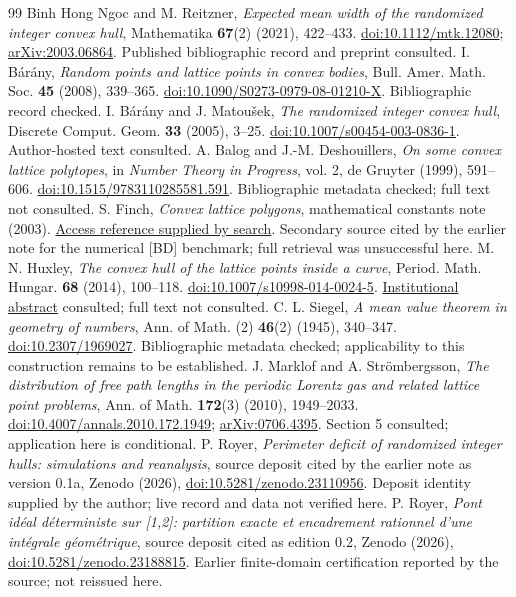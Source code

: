 \documentclass[11pt,a4paper]{article}
\begin{document}
\begin{thebibliography}{99}
\small
{} Binh Hong Ngoc and M. Reitzner, \emph{Expected mean width of the randomized integer convex hull}, Mathematika \textbf{67}(2) (2021), 422--433. \href{https://doi.org/10.1112/mtk.12080}{doi:10.1112/mtk.12080}; \href{https://arxiv.org/abs/2003.06864}{arXiv:2003.06864}. Published bibliographic record and preprint consulted.
 I. B\'ar\'any, \emph{Random points and lattice points in convex bodies}, Bull. Amer. Math. Soc. \textbf{45} (2008), 339--365. \href{https://doi.org/10.1090/S0273-0979-08-01210-X}{doi:10.1090/S0273-0979-08-01210-X}. Bibliographic record checked.
 I. B\'ar\'any and J. Matou\v{s}ek, \emph{The randomized integer convex hull}, Discrete Comput. Geom. \textbf{33} (2005), 3--25. \href{https://doi.org/10.1007/s00454-003-0836-1}{doi:10.1007/s00454-003-0836-1}. Author-hosted text consulted.
 A. Balog and J.-M. Deshouillers, \emph{On some convex lattice polytopes}, in \emph{Number Theory in Progress}, vol. 2, de Gruyter (1999), 591--606. \href{https://doi.org/10.1515/9783110285581.591}{doi:10.1515/9783110285581.591}. Bibliographic metadata checked; full text not consulted.
 S. Finch, \emph{Convex lattice polygons}, mathematical constants note (2003). \href{https://citeseerx.ist.psu.edu/document?doi=f490888bcfe4bcefa7ca0191182ae43f0cfca1e3&repid=rep1&type=pdf}{Access reference supplied by search}. Secondary source cited by the earlier note for the numerical [BD] benchmark; full retrieval was unsuccessful here.
 M. N. Huxley, \emph{The convex hull of the lattice points inside a curve}, Period. Math. Hungar. \textbf{68} (2014), 100--118. \href{https://doi.org/10.1007/s10998-014-0024-5}{doi:10.1007/s10998-014-0024-5}. \href{https://orca.cardiff.ac.uk/id/eprint/58596/}{Institutional abstract} consulted; full text not consulted.
 C. L. Siegel, \emph{A mean value theorem in geometry of numbers}, Ann. of Math. (2) \textbf{46}(2) (1945), 340--347. \href{https://doi.org/10.2307/1969027}{doi:10.2307/1969027}. Bibliographic metadata checked; applicability to this construction remains to be established.
 J. Marklof and A. Str\"ombergsson, \emph{The distribution of free path lengths in the periodic Lorentz gas and related lattice point problems}, Ann. of Math. \textbf{172}(3) (2010), 1949--2033. \href{https://doi.org/10.4007/annals.2010.172.1949}{doi:10.4007/annals.2010.172.1949}; \href{https://arxiv.org/abs/0706.4395}{arXiv:0706.4395}. Section 5 consulted; application here is conditional.
 P. Royer, \emph{Perimeter deficit of randomized integer hulls: simulations and reanalysis}, source deposit cited by the earlier note as version 0.1a, Zenodo (2026), \href{https://doi.org/10.5281/zenodo.23110956}{doi:10.5281/zenodo.23110956}. Deposit identity supplied by the author; live record and data not verified here.
 P. Royer, \emph{Pont id\'eal d\'eterministe sur [1,2]: partition exacte et encadrement rationnel d'une int\'egrale g\'eom\'etrique}, source deposit cited as edition 0.2, Zenodo (2026), \href{https://doi.org/10.5281/zenodo.23188815}{doi:10.5281/zenodo.23188815}. Earlier finite-domain certification reported by the source; not reissued here.
\end{thebibliography}
\end{document}
